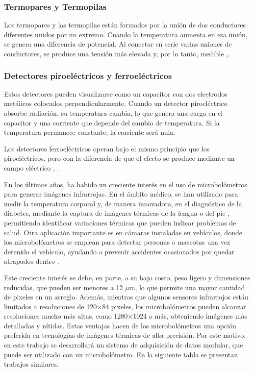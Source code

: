 		\subsubsection{Termopares y Termopilas}
		Los termopares y las termopilas están formados por la unión de dos conductores diferentes unidos por un extremo. Cuando la temperatura aumenta en esa unión, se genera una diferencia de potencial. Al conectar en serie varias uniones de conductores, se produce una tensión más elevada y, por lo tanto, medible \cite{Rogalski},\cite{Vincent}.
		
		\subsubsection{Detectores piroeléctricos y ferroeléctricos}
		Estos detectores pueden visualizarse como un capacitor con dos electrodos metálicos colocados perpendicularmente. Cuando un detector piroeléctrico absorbe radiación, su temperatura cambia, lo que genera una carga en el capacitor y una corriente que depende del cambio de temperatura. Si la temperatura permanece constante, la corriente será nula.

Los detectores ferroeléctricos operan bajo el mismo principio que los piroeléctricos, pero con la diferencia de que el efecto se produce mediante un campo eléctrico \cite{Rogalski}, \cite{BlancoMDA}.


En los últimos años, ha habido un creciente interés en el uso de microbolómetros para generar imágenes infrarrojas. En el ámbito médico, se han utilizado para medir la temperatura corporal \cite{Svantner2022} y, de manera innovadora, en el diagnóstico de la diabetes, mediante la captura de imágenes térmicas de la lengua \cite{WziatekKuczmik2024} o del pie \cite{Rocha2022}, permitiendo identificar variaciones térmicas que pueden indicar problemas de salud. Otra aplicación importante es en cámaras instaladas en vehículos, donde los microbolómetros se emplean para detectar personas o mascotas una vez detenido el vehículo, ayudando a prevenir accidentes ocasionados por quedar atrapados dentro \cite{Farhat2011}.


Este creciente interés se debe, en parte, a su bajo costo, peso ligero y dimensiones reducidas, que pueden ser menores a 12 $\mu$m, lo que permite una mayor cantidad de pixeles en un arreglo. Además, mientras que algunos sensores infrarrojos están limitados a resoluciones de 120$\times$84 pixeles, los microbolómetros pueden alcanzar resoluciones mucho más altas, como 1280$\times$1024 o más, obteniendo imágenes más detalladas y nítidas. Estas ventajas hacen de los microbolómetros una opción preferida en tecnologías de imágenes térmicas de alta precisión. Por este motivo, en este trabajo se desarrollará un sistema de adquisición de datos modular, que puede ser utilizado con un microbolómetro. En la siguiente tabla se presentan trabajos similares.

